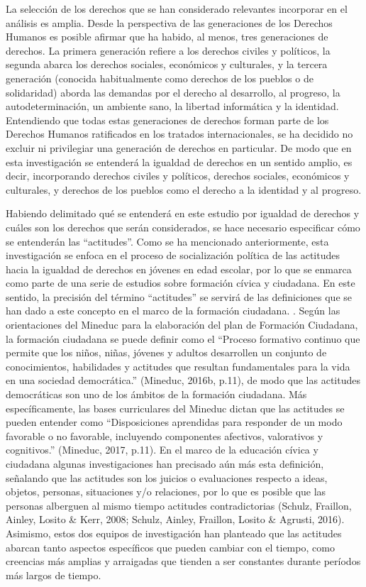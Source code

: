 \documentclass[12pt,twoside]{templates/facsothesis}
\begin{document}
La selección de los derechos que se han considerado relevantes incorporar en el análisis es amplia. Desde la perspectiva de las generaciones de los Derechos Humanos es posible afirmar que ha habido, al menos, tres generaciones de derechos. La primera generación refiere a los derechos civiles y políticos, la segunda abarca los derechos sociales, económicos y culturales, y la tercera generación (conocida habitualmente como derechos de los pueblos o de solidaridad) aborda las demandas por el derecho al desarrollo, al progreso, la autodeterminación, un ambiente sano, la libertad informática y la identidad. Entendiendo que todas estas generaciones de derechos forman parte de los Derechos Humanos ratificados en los tratados internacionales, se ha decidido no excluir ni privilegiar una generación de derechos en particular. De modo que en esta investigación se entenderá la igualdad de derechos en un sentido amplio, es decir, incorporando derechos civiles y políticos, derechos sociales, económicos y culturales, y derechos de los pueblos como el derecho a la identidad y al progreso.

Habiendo delimitado qué se entenderá en este estudio por igualdad de derechos y cuáles son los derechos que serán considerados, se hace necesario especificar cómo se entenderán las ``actitudes''. Como se ha mencionado anteriormente, esta investigación se enfoca en el proceso de socialización política de las actitudes hacia la igualdad de derechos en jóvenes en edad escolar, por lo que se enmarca como parte de una serie de estudios sobre formación cívica y ciudadana. En este sentido, la precisión del término ``actitudes'' se servirá de las definiciones que se han dado a este concepto en el marco de la formación ciudadana. . Según las orientaciones del Mineduc para la elaboración del plan de Formación Ciudadana, la formación ciudadana se puede definir como el ``Proceso formativo continuo que permite que los niños, niñas, jóvenes y adultos desarrollen un conjunto de conocimientos, habilidades y actitudes que resultan fundamentales para la vida en una sociedad democrática.'' (Mineduc, 2016b, p.11), de modo que las actitudes democráticas son uno de los ámbitos de la formación ciudadana. Más específicamente, las bases curriculares del Mineduc dictan que las actitudes se pueden entender como ``Disposiciones aprendidas para responder de un modo favorable o no favorable, incluyendo componentes afectivos, valorativos y cognitivos.'' (Mineduc, 2017, p.11). En el marco de la educación cívica y ciudadana algunas investigaciones han precisado aún más esta definición, señalando que las actitudes son los juicios o evaluaciones respecto a ideas, objetos, personas, situaciones y/o relaciones, por lo que es posible que las personas alberguen al mismo tiempo actitudes contradictorias (Schulz, Fraillon, Ainley, Losito \& Kerr, 2008; Schulz, Ainley, Fraillon, Losito \& Agrusti, 2016). Asimismo, estos dos equipos de investigación han planteado que las actitudes abarcan tanto aspectos específicos que pueden cambiar con el tiempo, como creencias más amplias y arraigadas que tienden a ser constantes durante períodos más largos de tiempo.
\end{document}
